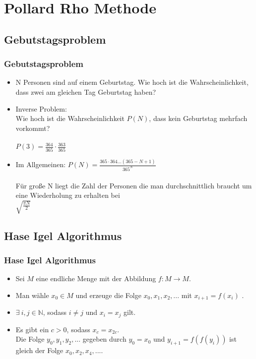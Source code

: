 \documentclass[mathserif, compress, german]{beamer}
\begin{document}
\section{Pollard Rho Methode}

\subsection{Gebutstagsproblem}

\begin{frame}
  \frametitle{Gebutstagsproblem}
  \begin{itemize}
    \item<2-> N Personen sind auf einem Geburtstag. Wie hoch ist die Wahrscheinlichkeit, dass zwei am gleichen Tag Geburtstag haben?
    \vspace{3mm}
    \item<3-> Inverse Problem: \\ Wie hoch ist die Wahrscheinlichkeit $P(N)$, dass kein Geburtstag mehrfach vorkommt?\\
    \ \\ $P(3)=\frac{364}{365}\cdot \frac{363}{365}$
    \vspace{3mm}
    \item<4-> Im Allgemeinen: $P(N)=\frac{365\cdot 364...(365-N+1)}{365^N}$\\
    \ \\     F\"ur gro\ss{}e N liegt die Zahl der Personen die man durchschnittlich braucht um eine Wiederholung zu erhalten bei \\
	     $\sqrt{\frac{\pi N}{2}}$
  \end{itemize}
\end{frame}

\subsection{Hase Igel Algorithmus}

\begin{frame}
  \frametitle{Hase Igel Algorithmus}
  \begin{itemize}
    \item<2-> Sei $M$ eine endliche Menge mit der Abbildung $f : M \rightarrow M$.
      \vspace{3mm}
    \item<3-> Man w\"ahle $x_0 \in M$ und erzeuge die Folge $x_0, x_1, x_2,...$ mit $x_{i+1} = f(x_i)$ .
      \vspace{3mm}
    \item<4-> $\exists \ i,j \in \mathbb{N}$, sodass $i \not= j$ und $x_i = x_j$ gilt.
      \vspace{3mm}
    \item<5-> Es gibt ein $c>0$, sodass $x_c=x_{2c}$.\\
              Die Folge $y_0, y_1, y_2,...$ gegeben durch $y_0=x_0$ und $y_{i+1}=f(f(y_i))$ ist gleich der Folge $x_0,x_2,x_4,...$.
  \end{itemize}
\end{frame}
\end{document}
